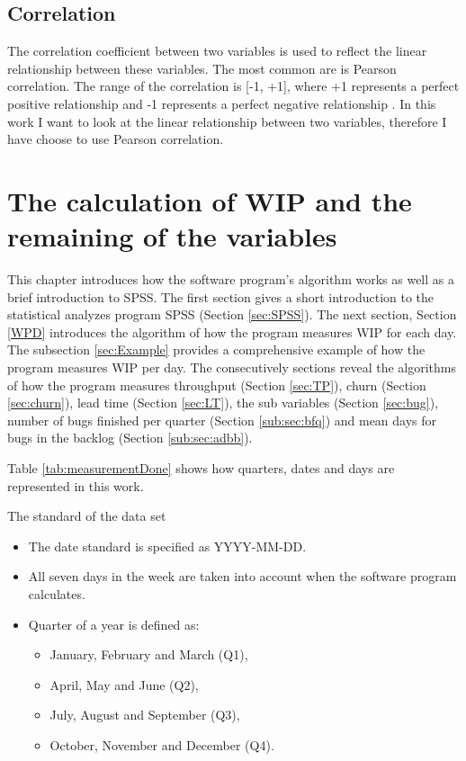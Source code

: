 \documentclass[UKenglish]{ifimaster}  %
\begin{document}
\section{Correlation}
The correlation coefficient between two variables is used to reflect the linear relationship between these variables. The most common are is Pearson correlation.  The range of the correlation is [-1, +1], where +1 represents a perfect positive relationship and -1 represents a perfect negative relationship \parencite{6683402}. In this work I want to look at the linear relationship between two variables, therefore I have choose to use Pearson correlation.

\chapter{The calculation of WIP and the remaining  of the variables}
\label{ch:DCC}
This chapter introduces how the software program's algorithm works as well as a brief introduction to SPSS.  The first section gives a short introduction to the statistical analyzes program SPSS  (Section \ref{sec:SPSS}). The next section, Section \ref{WPD} introduces the algorithm of how the program measures WIP for each day. The subsection \ref{sec:Example} provides a comprehensive example of how the program measures WIP per day. The consecutively sections reveal the algorithms of how the program measures  throughput (Section \ref{sec:TP}),  churn (Section \ref{sec:churn}),  lead time (Section \ref{sec:LT}), the sub variables (Section \ref{sec:bug}), number of bugs finished per quarter (Section  \ref{sub:sec:bfq}) and mean days for bugs in the backlog (Section \ref{sub:sec:adbb}). 

Table \ref{tab:measurementDone} shows how quarters, dates and days are represented in this work. 

\begin{table}[!ht]
\centering
\caption{The standard of the data set}
\begin{itemize}
\item The date standard is specified as YYYY-MM-DD.
\item All seven days in the week are taken into account when the software program calculates.
\item Quarter of a year is defined as: 
\begin{itemize}
\item January, February and March (Q1),
\item April, May and June (Q2),
\item July, August and September (Q3),
\item October, November and December (Q4).
\end{itemize}
\parencite{Quarter}
\label{tab:measurementDone}
\end{itemize}
\end{table}
\end{document}

